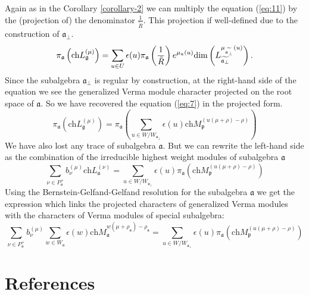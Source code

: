 \documentclass[12pt]{article}
\theoremstyle{definition}
\newcommand{\gf}{\mathfrak{g}}
\newcommand{\af}{\mathfrak{a}}
\newcommand{\afb}{\mathfrak{a}_{\bot}}
\newcommand{\pf}{\mathfrak{p}}
\begin{document}
\begin{enumerate}
Again as in the Corollary \ref{corollary-2} we can multiply the equation (\ref{eq:11}) by the (projection of) the denominator $\frac{1}{\tilde R}$. This projection if well-defined due to the construction of $\afb$.
\begin{equation}
  \label{eq:12}
  \pi_{\af}\left(\mathrm{ch} L^{(\mu)}_{\gf}\right)= \sum_{u\in U}\epsilon(u) \pi_{\af}\left(\frac{1}{\tilde R}\right) e^{\mu_{\af}(u)}\mathrm{dim} \left( L_{\widetilde{\af_{\perp }}}^{\mu _{%
\widetilde{\af_{\perp }}}\left( u\right) }\right) .
\end{equation}
Since the subalgebra $\afb$ is regular by construction,  at the right-hand side of the equation we see the generalized Verma module character projected on the root space of $\af$. So we have recovered the equation (\ref{eq:7}) in the projected form.
\begin{equation}
  \label{eq:13}
   \pi_{\af}\left(\mathrm{ch} L^{(\mu)}_{\gf}\right)= \pi_{\af}\left(  \sum_{u \in W/W_{\afb}} \epsilon(u) \mathrm{ch} M^{(u(\mu+\rho)-\rho)}_{\pf}\right)
\end{equation}
We have also lost any trace of subalgebra $\af$. But we can rewrite the left-hand side as the combination of the irreducible highest weight modules of subalgebra $\af$
\begin{equation}
  \label{eq:14}
  \sum_{\nu\in P^{+}_{\af}} b^{(\mu)}_{\nu} \mathrm{ch} L^{(\nu)}_{\af}= \sum_{u \in W/W_{\afb}} \epsilon(u) \pi_{\af}\left(   \mathrm{ch} M^{(u(\mu+\rho)-\rho)}_{\pf}\right)
\end{equation}
Using the Bernstein-Gelfand-Gelfand resolution for the subalgebra $\af$ we get the expression which links the projected characters of generalized Verma modules with the characters of Verma modules of special subalgebra:
\begin{equation}
  \label{eq:15}
  \sum_{\nu\in P^+_{\af}}b^{(\mu)}_{\nu}\sum_{ w\in W_{\af}} \epsilon(w) \mathrm{ch} M_{\af}^{w(\mu+\rho_{\af})-\rho_{\af}} =  \sum_{u \in W/W_{\afb}} \epsilon(u) \pi_{\af}\left(   \mathrm{ch} M^{(u(\mu+\rho)-\rho)}_{\pf}\right)
\end{equation}

\end{enumerate}

% 
% 
% 
% 
% 
\section*{References}
{}

\end{document}
